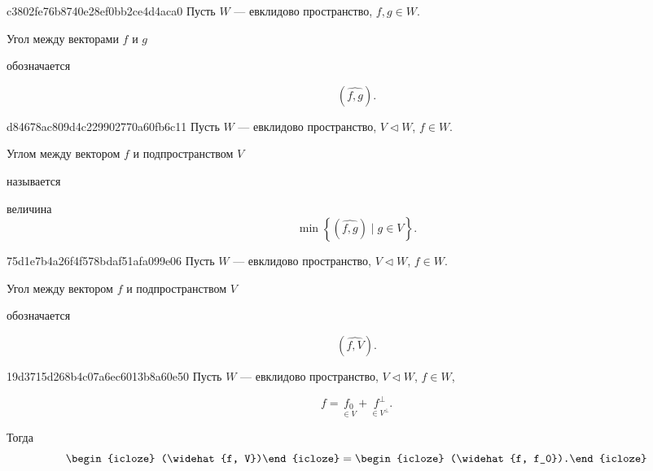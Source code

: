 \begin{note}{c3802fe76b8740e28ef0bb2ce4d4aca0}
    Пусть \({ W }\) --- евклидово пространство, \({ f, g \in W }\).
    \begin{icloze}{2}Угол между векторами \({ f }\) и \({ g }\)\end{icloze} обозначается
    \begin{icloze}{1}
        \[
            (\widehat{f, g}).
        \]
    \end{icloze}
\end{note}

\begin{note}{d84678ac809d4c229902770a60fb6c11}
    Пусть \({ W }\) --- евклидово пространство, \({ V \triangleleft W }\), \({ f \in W }\).
    \begin{icloze}{2}Углом между вектором \({ f }\) и подпространством \({ V }\)\end{icloze} называется \begin{icloze}{1}величина
    \[
        \min \left\{ (\widehat{f, g}) \mid  g \in V \right\}.
    \]\end{icloze}
\end{note}

\begin{note}{75d1e7b4a26f4f578bdaf51afa099e06}
    Пусть \({ W }\) --- евклидово пространство, \({ V \triangleleft W }\), \({ f \in W }\).
    \begin{icloze}{2}Угол между вектором \({ f }\) и подпространством \({ V }\)\end{icloze} обозначается
    \begin{icloze}{1}
        \[
            (\widehat{f, V}).
        \]
    \end{icloze}
\end{note}

\begin{note}{19d3715d268b4c07a6ec6013b8a60e50}
    Пусть \({ W }\) --- евклидово пространство, \({ V \triangleleft W }\), \({ f \in W }\),
    \begin{icloze}{3}
        \[
            f = \underset{\in V}{f_0} + \underset{\in V^{\perp}}{f^{\perp}}.
        \]
    \end{icloze}
    Тогда
    \[
        \begin{icloze}{2}(\widehat{f, V})\end{icloze} = \begin{icloze}{1}(\widehat{f, f_0}).\end{icloze}
    \]
\end{note}

